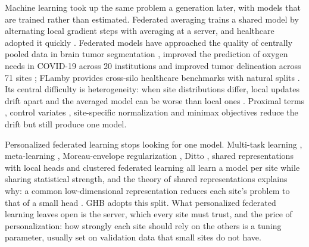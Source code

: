 \documentclass[acmsmall,screen,review]{acmart}
\theoremstyle{acmdefinition}
\begin{document}
Machine learning took up the same problem a generation later, with models that are trained rather than estimated. Federated averaging \cite{mcmahan2017communication} trains a shared model by alternating local gradient steps with averaging at a server, and healthcare adopted it quickly \cite{nguyen2022federated,rieke2020future,xu2021federated}. Federated models have approached the quality of centrally pooled data in brain tumor segmentation \cite{sheller2020federated}, improved the prediction of oxygen needs in COVID-19 across 20 institutions \cite{dayan2021federated} and improved tumor delineation across 71 sites \cite{pati2022federated}; FLamby \cite{ogierduterrail2022flamby} provides cross-silo healthcare benchmarks with natural splits \cite{ogierduterrail2022flamby}. Its central difficulty is heterogeneity: when site distributions differ, local updates drift apart and the averaged model can be worse than local ones \cite{hsieh2020non,zhao2018federated}. Proximal terms \cite{li2020federated}, control variates \cite{karimireddy2020scaffold}, site-specific normalization \cite{li2021fedbn} and minimax objectives \cite{mohri2019agnostic} reduce the drift but still produce one model.

Personalized federated learning stops looking for one model. Multi-task learning \cite{smith2017federated}, meta-learning \cite{fallah2020personalized}, Moreau-envelope regularization \cite{tdinh2020personalized}, Ditto \cite{li2021ditto}, shared representations with local heads \cite{collins2021exploiting} and clustered federated learning \cite{ghosh2020efficient} all learn a model per site while sharing statistical strength, and the theory of shared representations explains why: a common low-dimensional representation reduces each site's problem to that of a small head \cite{du2021few,maurer2016benefit,tripuraneni2020theory}. GHB adopts this split. What personalized federated learning leaves open is the server, which every site must trust, and the price of personalization: how strongly each site should rely on the others is a tuning parameter, usually set on validation data that small sites do not have.
\end{document}

